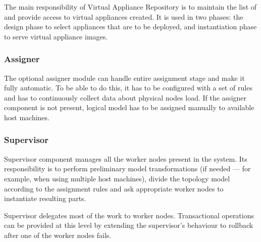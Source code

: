 \documentclass[11pt,openany]{book}
\begin{document}
          The main responsibility of Virtual Appliance Repository is to maintain the list of and provide access to
          virtual appliances created. It is used in two phases: the design phase to select appliances that are to be
          deployed, and instantiation phase to serve virtual appliance images. \\

          \noindent
          \begin{minipage}{\textwidth}
            
          \end{minipage}
          

        \subsubsection{Assigner}

          The optional assigner module can handle entire assignment stage and make it fully automatic. To be able to do
          this, it has to be configured with a set of rules and has to continuously collect data about physical nodes
          load. If the assigner component is not present, logical model has to be assigned manually to available host
          machines.


        \subsubsection{Supervisor}

          Supervisor component manages all the worker nodes present in the system. Its responsibility is to perform
          preliminary model transformations (if needed --- for example, when using multiple host machines), divide the
          topology model according to the assignment rules and ask appropriate worker nodes to instantiate resulting
          parts.

          Supervisor delegates most of the work to worker nodes. Transactional operations can be provided at this level
          by extending the supervisor's behaviour to rollback after one of the worker nodes fails. \\

          \noindent
          \begin{minipage}{\textwidth}
            
          \end{minipage}
\end{document}
